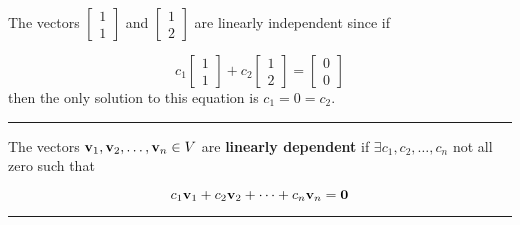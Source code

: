 \begin{example}
The vectors $\begin{bmatrix} 1 \\1\end{bmatrix}$ and  $\begin{bmatrix} 1 \\2 \end{bmatrix}$ are linearly independent since if 

\[  c_1  \begin{bmatrix} 1 \\1\end{bmatrix} + c_2  \begin{bmatrix} 1 \\2\end{bmatrix} =  \begin{bmatrix} 0 \\0 \end{bmatrix} \]
then the only solution to this equation is $c_1 = 0 = c_2$.  

 \end{example}
	
	 
\rule[0.01in]{\textwidth}{0.0025in}


 
 
 
 
 
 
 
 
 
 
 
 
 
 
 
 
 
 

\begin{tcolorbox}[colback=yellow!10!,colframe=gray!15!]
	\begin{definition}
		The vectors ${\bf v}_1, {\bf v}_2,  \dots, {\bf v}_n \in V$ are \textbf{linearly dependent} if $\exists c_1, c_2, \dots, c_n$ not all zero such that 
		
\[  c_1 {\bf v}_1 + c_2 {\bf v}_2 + \cdots + c_n {\bf v}_n = {\bf 0} \]

	\end{definition}
	 
\end{tcolorbox}

 
\rule[0.01in]{\textwidth}{0.0025in}
































